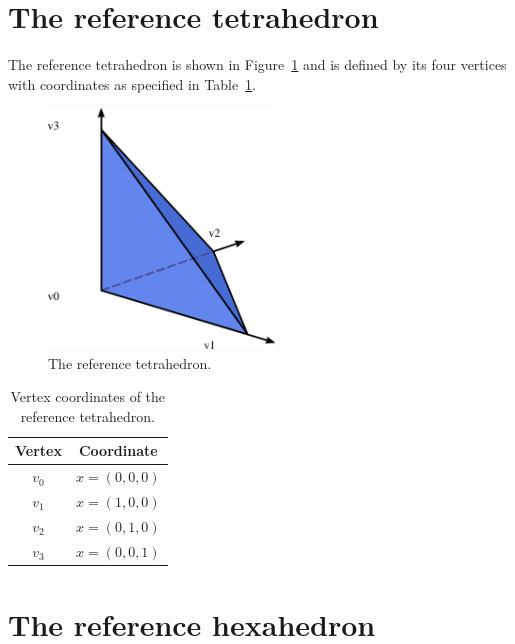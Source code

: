 \newpage
\section{The reference tetrahedron}

The reference tetrahedron is shown in Figure~\ref{fig:tetrahedron} and
is defined by its four vertices with coordinates as specified in
Table~\ref{tab:tetrahedron,vertices}.

\begin{figure}[H]
  \begin{center}
    \includegraphics[width=6cm]{eps/tetrahedron.eps}
    \caption{The reference tetrahedron.}
    \label{fig:tetrahedron}
  \end{center}
\end{figure}

\begin{table}[H]
\linespread{1.2}\selectfont
  \begin{center}
    \begin{tabular}{|c|c|}
      \hline
      Vertex & Coordinate \\
      \hline
      \hline
      $v_0$ & $x = (0, 0, 0)$ \\
      \hline
      $v_1$ & $x = (1, 0, 0)$ \\
      \hline
      $v_2$ & $x = (0, 1, 0)$ \\
      \hline
      $v_3$ & $x = (0, 0, 1)$ \\
      \hline
    \end{tabular}
    \caption{Vertex coordinates of the reference tetrahedron.}
    \label{tab:tetrahedron,vertices}
  \end{center}
\end{table}

\newpage
\section{The reference hexahedron}

